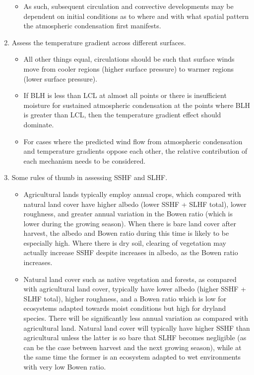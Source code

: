 \begin{enumerate}
\begin{itemize}
		\item As such, subsequent circulation and convective developments may be dependent on initial conditions as to where and with what spatial pattern the atmospheric condensation first manifests.
	\end{itemize}
	\item Assess the temperature gradient across different surfaces.
	\begin{itemize}
		\item All other things equal, circulations should be such that surface winds move from cooler regions (higher surface pressure) to warmer regions (lower surface pressure).
		\item If \ac{BLH} is less than \ac{LCL} at almost all points or there is insufficient moisture for sustained atmospheric condensation at the points where \ac{BLH} is greater than \ac{LCL}, then the temperature gradient effect should dominate.
		\item For cases where the predicted wind flow from atmospheric condensation and temperature gradients oppose each other, the relative contribution of each mechanism needs to be considered.
	\end{itemize}
	\item Some rules of thumb in assessing \ac{SSHF} and \ac{SLHF}.
	\begin{itemize}
		\item Agricultural lands typically employ annual crops, which compared with natural land cover have higher albedo (lower \ac{SSHF} + \ac{SLHF} total), lower roughness, and greater annual variation in the Bowen ratio (which is lower during the growing season). When there is bare land cover after harvest, the albedo and Bowen ratio during this time is likely to be especially high. Where there is dry soil, clearing of vegetation may actually increase \ac{SSHF} despite increases in albedo, as the Bowen ratio increases.
		\item Natural land cover such as native vegetation and forests, as compared with agricultural land cover, typically have lower albedo (higher \ac{SSHF} + \ac{SLHF} total), higher roughness, and a Bowen ratio which is low for ecosystems adapted towards moist conditions but high for dryland species. There will be significantly less annual variation as compared with agricultural land. Natural land cover will typically have higher \ac{SSHF} than agricultural unless the latter is so bare that \ac{SLHF} becomes negligible (as can be the case between harvest and the next growing season), while at the same time the former is an ecosystem adapted to wet environments with very low Bowen ratio. 

\end{itemize}
\end{enumerate}
